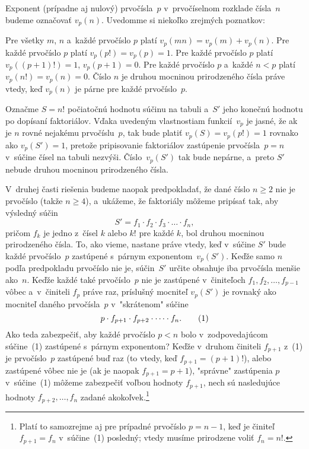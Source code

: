 {%
Exponent (prípadne aj nulový) prvočísla~$p$ v~prvočíselnom rozklade čísla~$n$ budeme označovať
$v_p(n)$. Uvedomme si niekoľko zrejmých poznatkov:

\bulet Pre všetky $m$, $n$ a~každé prvočíslo $p$ platí $v_p(mn) = v_p(m)+v_p(n)$.
\bulet Pre každé prvočíslo $p$ platí $v_p(p!) = v_p(p) = 1$.
\bulet Pre každé prvočíslo $p$ platí $v_p((p+1)!) = 1$, $v_p(p+1) =0$.
\bulet Pre každé prvočíslo $p$ a~každé $n < p$ platí $v_p(n!) = v_p(n) = 0$.
\bulet Číslo $n$ je druhou mocninou prirodzeného čísla práve vtedy, keď $v_p(n)$ je párne
pre každé prvočíslo~$p$.

Označme $S=n!$ počiatočnú hodnotu súčinu na tabuli a~$S'$ jeho konečnú
hodnotu po dopísaní faktoriálov. Vďaka uvedeným vlastnostiam funkcií~$v_p$
je jasné, že ak je $n$ rovné nejakému
prvočíslu~$p$, tak bude platiť $v_p(S) = v_p(p!) = 1$ rovnako ako
$v_p(S') = 1$, pretože pripisovanie faktoriálov zastúpenie prvočísla~$p=n$
v~súčine čísel na tabuli nezvýši. Číslo~$v_p(S')$ tak bude nepárne,
a~preto $S'$ nebude druhou mocninou prirodzeného čísla.

V~druhej časti riešenia budeme naopak predpokladať, že dané číslo
$n\ge2$ nie je prvočíslo (takže $n\ge4$), a~ukážeme,
že faktoriály môžeme pripísať
tak, aby výsledný súčin
$$
S'=f_1\cdot f_2\cdot f_3\cdot\dots\cdot f_n,
$$
pričom $f_k$ je jedno z~čísel $k$ alebo $k!$ pre každé $k$,
bol druhou mocninou prirodzeného čísla. To, ako vieme, nastane práve
vtedy, keď v~súčine $S'$ bude každé prvočíslo~$p$
zastúpené s~párnym exponentom~$v_p(S')$.
Keďže samo $n$ podľa predpokladu prvočíslo nie je, súčin~$S'$
určite obsahuje iba prvočísla menšie ako~$n$.
Keďže každé také prvočíslo~$p$ nie je zastúpené v~činiteľoch
$f_1,f_2,\dots,f_{p-1}$ vôbec a~v~činiteli $f_{p}$ práve raz,
príslušný mocniteľ $v_p(S')$ je rovnaký ako mocniteľ
daného prvočísla~$p$ v~"skrátenom" súčine
$$
p\cdot f_{p+1}\cdot f_{p+2}\cdot\dots\cdot f_{n}. \tag1
$$
Ako teda zabezpečiť, aby každé prvočíslo $p<n$ bolo v~zodpovedajúcom
súčine~(1) zastúpené s~párnym exponentom? Keďže v~druhom
činiteli $f_{p+1}$ z~(1) je prvočíslo~$p$ zastúpené buď raz (to vtedy, keď
$f_{p+1}=(p+1)!$), alebo zastúpené vôbec nie je
(ak je naopak $f_{p+1}=p+1$), "správne"
zastúpenia $p$ v~súčine~(1) môžeme zabezpečiť voľbou hodnoty $f_{p+1}$,
nech sú nasledujúce hodnoty $f_{p+2},\dots,f_{n}$ zadané
akokoľvek.\footnote{Platí to samozrejme aj pre prípadné prvočíslo
$p=n-1$, keď je činiteľ $f_{p+1}=f_{n}$ v~súčine~(1) posledný; vtedy
musíme prirodzene voliť $f_n=n!$.}

}
